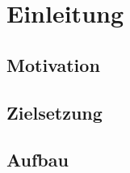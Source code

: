\chapter{Einleitung}
\label{chap:einleitung}


\section{Motivation}
\label{chap:Motivation}


\section{Zielsetzung}
\label{chap:Zielsetzung}

\section{Aufbau}

